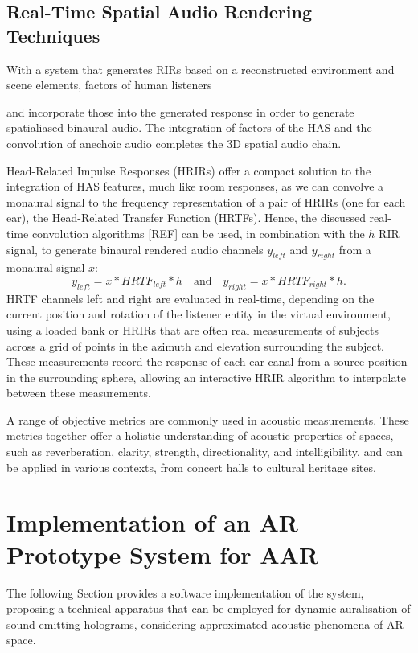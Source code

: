 \subsection{Real-Time Spatial Audio Rendering Techniques}

With a system that generates RIRs based on a reconstructed environment and scene elements, factors of human listeners

and incorporate those into the generated response in order to generate spatialiased binaural audio. The integration of factors of the HAS and the convolution of anechoic audio completes the 3D spatial audio chain.\par
Head-Related Impulse Responses (HRIRs) offer a compact solution to the integration of HAS features, much like room responses, as we can convolve a monaural signal to the frequency representation of a pair of HRIRs (one for each ear), the Head-Related Transfer Function (HRTFs). Hence, the discussed real-time convolution algorithms [REF] can be used, in combination with the $h$ RIR signal, to generate binaural rendered audio channels $y_{left}$ and $y_{right}$ from a monaural signal $x$:
\begin{equation}
    y_{left} = x * HRTF_{left} * h \quad \textrm{and} \quad  y_{right} = x * HRTF_{right} * h \textrm{.}
\end{equation}
HRTF channels left and right are evaluated in real-time, depending on the current position and rotation of the listener entity in the virtual environment, using a loaded bank or HRIRs that are often real measurements of subjects across a grid of points in the azimuth and elevation surrounding the subject. These measurements record the response of each ear canal from a source position in the surrounding sphere, allowing an interactive HRIR algorithm to interpolate between these measurements.

A range of objective metrics are commonly used in acoustic measurements. These metrics together offer a holistic understanding of acoustic properties of spaces, such as reverberation, clarity, strength, directionality, and intelligibility, and can be applied in various contexts, from concert halls to cultural heritage sites. 


\section{Implementation of an AR Prototype System for AAR}
The following Section provides a software implementation of the system, proposing a technical apparatus that can be employed for dynamic auralisation of sound-emitting holograms, considering approximated acoustic phenomena of AR space.

